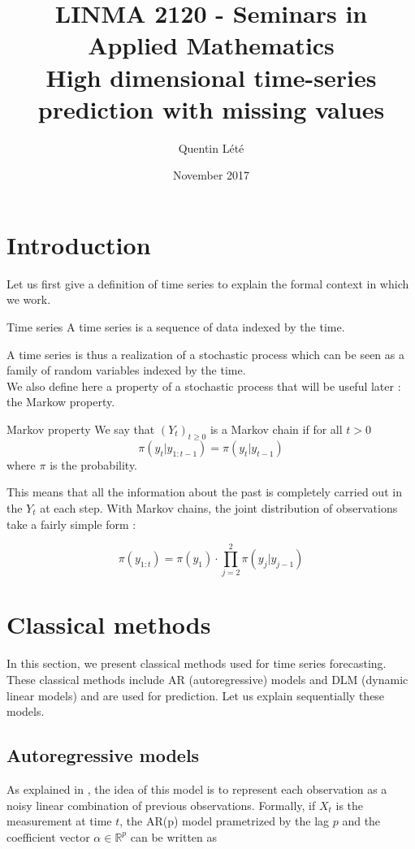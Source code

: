 \documentclass{article}
\title{LINMA 2120 - Seminars in Applied Mathematics \\
        High dimensional time-series prediction with missing values}
\author{Quentin Lété}
\date{November 2017}
\begin{document}
\maketitle

\section{Introduction}

Let us first give a definition of time series to explain the formal context in which we work. \\

\theoremstyle{definition}
\begin{definition}{Time series}
A time series is a sequence of data indexed by the time.
\end{definition}

A time series is thus a realization of a stochastic process which can be seen as a family of random variables indexed by the time. \\

We also define here a property of a stochastic process that will be useful later : the Markow property. \\

\theoremstyle{definition}
\begin{definition}{Markov property}
We say that $(Y_t)_{t \ge 0}$ is a Markov chain if for all $t > 0$
$$\pi(y_t|y_{1:t-1}) = \pi(y_t|y_{t-1})$$
where $\pi$ is the probability.
\end{definition}

This means that all the information about the past is completely carried out in the $Y_t$ at each step. With Markov chains, the joint distribution of observations take a fairly simple form :

$$\pi(y_{1:t}) = \pi(y_1) \cdot \prod_{j=2}^2 \pi(y_j|y_{j-1})$$

\section*{Classical methods}
In this section, we present classical methods used for time series forecasting.
These classical methods include AR (autoregressive) models and DLM (dynamic linear models) and are used for prediction.
Let us explain sequentially these models.

\subsection*{Autoregressive models}
As explained in \cite{pmlr-v37-anava15}, the idea of this model is to represent each observation as a noisy linear combination of previous observations.
Formally, if $X_t$ is the measurement at time $t$, the AR(p) model prametrized by the lag $p$ and the coefficient vector $\alpha \in \mathbb{R}^p$ can be written as
\end{document}
